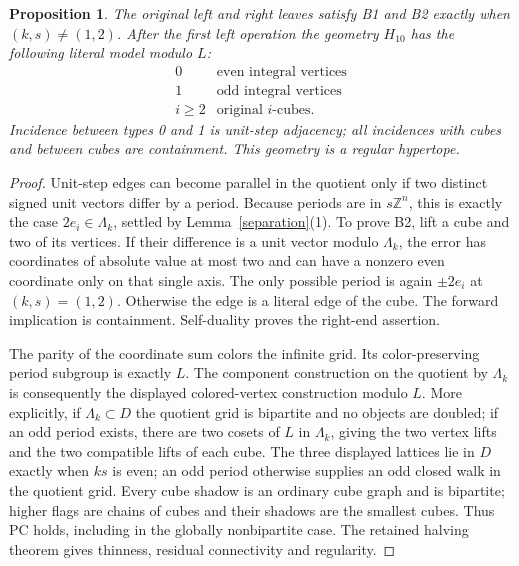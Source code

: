 \documentclass[11pt,a4paper]{article}
\newtheorem{proposition}[theorem]{Proposition}
\newcommand{\Z}{\mathbb Z}
\begin{document}
\begin{proposition}\label{first}
The original left and right leaves satisfy B1 and B2 exactly when
$(k,s)\ne(1,2)$. After the first left operation the geometry $H_{10}$
has the following literal model modulo $L$:
\[
\begin{array}{c|l}
0&\text{even integral vertices}\\
1&\text{odd integral vertices}\\
i\ge2&\text{original }i\text{-cubes}.
\end{array}
\]
Incidence between types 0 and 1 is unit-step adjacency; all incidences
with cubes and between cubes are containment. This geometry is a
regular hypertope.
\end{proposition}
\begin{proof}
Unit-step edges can become parallel in the quotient only if two
distinct signed unit vectors differ by a period. Because periods are
in $s\Z^n$, this is exactly the case $2e_i\in\Lambda_k$, settled
by Lemma~\ref{separation}(1). To prove B2, lift a cube and two of its
vertices. If their difference is a unit vector modulo $\Lambda_k$,
the error has coordinates of absolute value at most two and can have
a nonzero even coordinate only on that single axis. The only possible
period is again $\pm2e_i$ at $(k,s)=(1,2)$. Otherwise the edge is a
literal edge of the cube. The forward implication is containment.
Self-duality proves the right-end assertion.

The parity of the coordinate sum colors the infinite grid. Its
color-preserving period subgroup is exactly $L$. The component
construction on the quotient by $\Lambda_k$ is consequently the
displayed colored-vertex construction modulo $L$. More explicitly,
if $\Lambda_k\subset D$ the quotient grid is bipartite and no
objects are doubled; if an odd period exists, there are two cosets
of $L$ in $\Lambda_k$, giving the two vertex lifts and the two
compatible lifts of each cube. The three displayed lattices lie in
$D$ exactly when $ks$ is even; an odd period otherwise supplies
an odd closed walk in the quotient grid. Every cube shadow is an ordinary
cube graph and is bipartite; higher flags are chains of cubes and
their shadows are the smallest cubes. Thus PC holds, including
in the globally nonbipartite case. The retained halving theorem
gives thinness, residual connectivity and regularity.
\end{proof}
\end{document}
